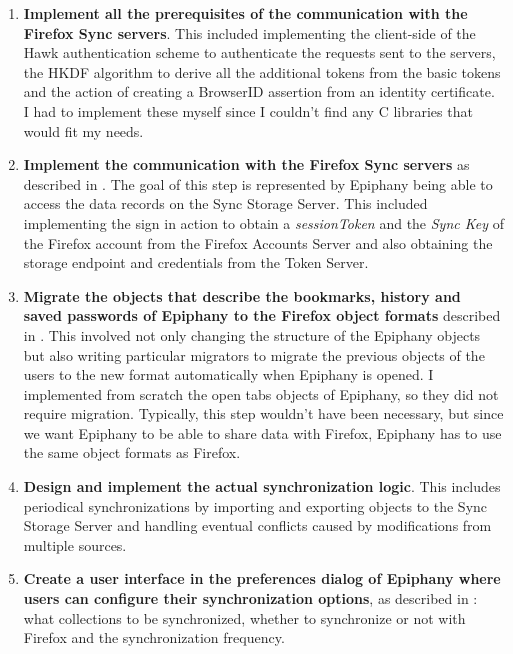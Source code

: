 \begin{enumerate}
  \item \textbf{Implement all the prerequisites of the communication with the Firefox Sync servers}. This included implementing the client-side of the Hawk authentication scheme to authenticate the requests sent to the servers, the HKDF algorithm to derive all the additional tokens from the basic tokens and the action of creating a BrowserID assertion from an identity certificate. I had to implement these myself since I couldn't find any C libraries that would fit my needs.

  \item \textbf{Implement the communication with the Firefox Sync servers} as described in . The goal of this step is represented by Epiphany being able to access the data records on the Sync Storage Server. This included implementing the sign in action to obtain a \textit{sessionToken} and the \textit{Sync Key} of the Firefox account from the Firefox Accounts Server and also obtaining the storage endpoint and credentials from the Token Server.

  \item \textbf{Migrate the objects that describe the bookmarks, history and saved passwords of Epiphany to the Firefox object formats} described in . This involved not only changing the structure of the Epiphany objects but also writing particular migrators to migrate the previous objects of the users to the new format automatically when Epiphany is opened. I implemented from scratch the open tabs objects of Epiphany, so they did not require migration. Typically, this step wouldn't have been necessary, but since we want Epiphany to be able to share data with Firefox, Epiphany has to use the same object formats as Firefox.

  \item \textbf{Design and implement the actual synchronization logic}. This includes periodical synchronizations by importing and exporting objects to the Sync Storage Server and handling eventual conflicts caused by modifications from multiple sources.

  \item \textbf{Create a user interface in the preferences dialog of Epiphany where users can configure their synchronization options}, as described in : what collections to be synchronized, whether to synchronize or not with Firefox and the synchronization frequency.
\end{enumerate}

